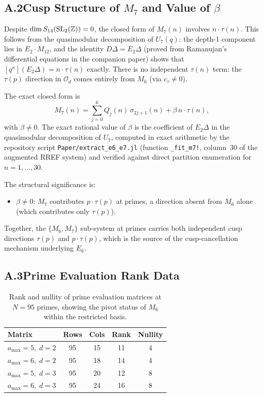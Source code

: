 \subsection*{A.2\quad Cusp Structure of $M_7$ and Value of $\beta$}
\label{app:M7-formula}

Despite $\dim S_{14}(\operatorname{SL}_2(\mathbb{Z}))=0$, the closed form of $M_7(n)$ involves
$n\cdot\tau(n)$.
This follows from the quasimodular decomposition of $U_7(q)$: the depth-1 component
lies in $E_2\cdot M_{12}$, and the identity $D\Delta = E_2\Delta$ (proved from Ramanujan's differential equations
in the companion paper) shows that
$[q^n](E_2\Delta)=n\cdot\tau(n)$ exactly.
There is no independent $\tau(n)$ term: the $\tau(p)$ direction in $\mathcal{O}_d$
comes entirely from $M_6$ (via $c_\tau\ne 0$).

The exact closed form is
\[
  M_7(n) = \sum_{j=0}^{6} Q_j(n)\,\sigma_{2j+1}(n) + \beta\,n\cdot\tau(n),
\]
with $\beta\ne 0$.
The exact rational value of $\beta$ is the coefficient of $E_2\Delta$ in the
quasimodular decomposition of $U_7$, computed in exact arithmetic by the repository
script \texttt{Paper/extract\_e6\_e7.jl} (function \texttt{\_fit\_m7!}, column~30
of the augmented RREF system) and verified against direct partition enumeration for
$n=1,\dots,30$.

The structural significance is:
\begin{itemize}
  \item $\beta\ne 0$: $M_7$ contributes $p\cdot\tau(p)$ at primes, a direction absent
        from $M_6$ alone (which contributes only $\tau(p)$).
\end{itemize}
Together, the $\{M_6,M_7\}$ sub-system at primes carries both independent cusp
directions $\tau(p)$ and $p\cdot\tau(p)$, which is the source of the
cusp-cancellation mechanism underlying $E_6$.

\subsection*{A.3\quad Prime Evaluation Rank Data}
\label{app:rank-data}

\begin{table}[H]
\centering
\caption{Rank and nullity of prime evaluation matrices at $N=95$ primes,
         showing the pivot status of $M_6$ within the restricted basis.}
\label{tab:app-pivot}
\begin{tabular}{@{}lcccc@{}}
\toprule
Matrix & Rows & Cols & Rank & Nullity \\
\midrule
$a_{\max}=5,\;d=2$ & 95 & 15 & 11 & 4 \\
$a_{\max}=6,\;d=2$ & 95 & 18 & 14 & 4 \\
$a_{\max}=5,\;d=3$ & 95 & 20 & 12 & 8 \\
$a_{\max}=6,\;d=3$ & 95 & 24 & 16 & 8 \\
\bottomrule
\end{tabular}
\end{table}

